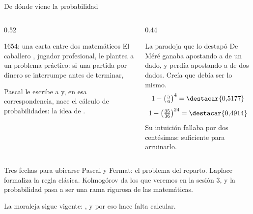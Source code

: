 \documentclass[aspectratio=169,10pt]{beamer}
\begin{document}
\begin{frame}{De dónde viene la probabilidad}
  \scriptsize
  \begin{columns}[T,onlytextwidth]
    \begin{column}{0.52\textwidth}
      \begin{block}{1654: una carta entre dos matemáticos}
        \tiny
        El caballero , jugador profesional, le plantea a
         un problema práctico: si una partida por dinero se
        interrumpe antes de terminar, 

        \vspace{0.08cm}
        Pascal le escribe a  y, en esa correspondencia,
        nace el cálculo de probabilidades: la idea de .
      \end{block}
    \end{column}
    \begin{column}{0.44\textwidth}
      \begin{exampleblock}{La paradoja que lo destapó}
        \tiny
        De Méré ganaba apostando a  de un dado, y perdía apostando a  de dos dados. Creía que debía ser lo mismo.
        \[ 1-\left(\tfrac{5}{6}\right)^{4} = \destacar{0{,}5177} \]
        \[ 1-\left(\tfrac{35}{36}\right)^{24} = \destacar{0{,}4914} \]
        Su intuición fallaba por dos centésimas: suficiente para arruinarlo.
      \end{exampleblock}
    \end{column}
  \end{columns}

  \vspace{0.08cm}
  \begin{alertblock}{Tres fechas para ubicarse}
    \tiny
     Pascal y Fermat: el problema del reparto. \quad
     Laplace formaliza la regla clásica. \quad
     Kolmogórov da los  que veremos en la sesión
    3, y la probabilidad pasa a ser una rama rigurosa de las matemáticas.
  \end{alertblock}

  \vspace{0.05cm}
  {\tiny\color{uniGris} La moraleja sigue vigente:
  , y por eso hace falta
  calcular.}
\end{frame}
\end{document}
